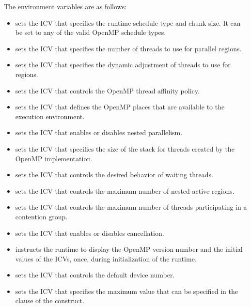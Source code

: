 The environment variables are as follows:

\begin{itemize}
\item {} sets the  ICV that specifies the runtime schedule type 
and chunk size. It can be set to any of the valid OpenMP schedule types.

\item {} sets the  ICV that specifies the number of threads 
to use for parallel regions.

\item {} sets the  ICV that specifies the dynamic adjustment of 
threads to use for  regions.

\item {} sets the  ICV that controls the OpenMP thread affinity 
policy. 

\item {} sets the  ICV that defines the OpenMP places that 
are available to the execution environment.

\item {} sets the  ICV that enables or disables nested parallelism.

\item {} sets the  ICV that specifies the size of the stack for 
threads created by the OpenMP implementation.

\item {} sets the  ICV that controls the desired behavior 
of waiting threads. 

\item {} sets the  ICV that controls the 
maximum number of nested active  regions. 

\item {} sets the  ICV that controls the maximum 
number of threads participating in a contention group.

\item {} sets the  ICV that enables or disables cancellation.

\item {} instructs the runtime to display the OpenMP version number 
and the initial values of the ICVs, once, during initialization of the runtime.

\item {} sets the  ICV that controls the default 
device number.

\item {} sets the  ICV that specifies the maximum
value that can be specified in the  clause of the  construct.

\end{itemize}

